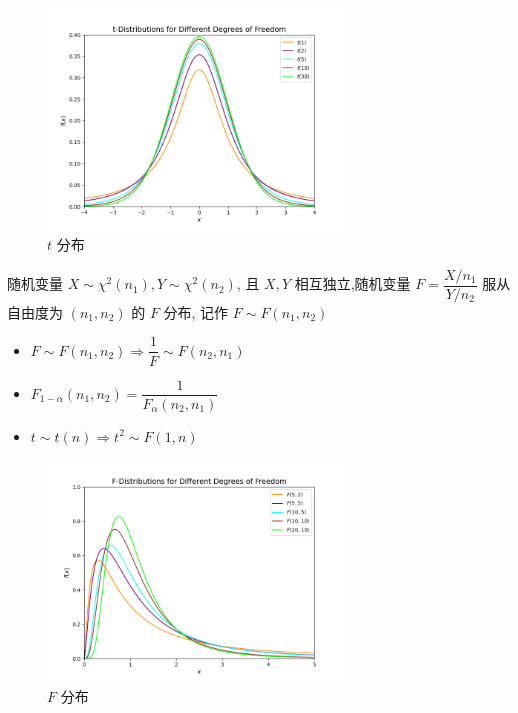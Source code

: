 \begin{figure}[H]
	\centering  %
	\includegraphics[width=0.7\textwidth]{"figure/Note/t分布.png"}
	\caption{ $t$ 分布}
	\label{fig: $t$ 分布}
\end{figure}

\begin{definition}[$F$ 分布]

	随机变量 $X\sim \chi^2(n_{1}), Y\sim \chi^2(n_{2})$, 且 $X,Y$ 相互独立,随机变量 $F = \dfrac{X/n_{1}}{Y/n_{2}}$ 
	服从自由度为 $(n_{1},n_{2})$ 的 $F$ 分布, 记作 $F\sim F(n_{1},n_{2})$
	
	\begin{itemize}
		\item $F\sim F(n_{1},n_{2})\Rightarrow \dfrac{1}{F}\sim F(n_{2},n_{1})$
		\item $F_{1-\alpha}(n_{1},n_{2})=\dfrac{1}{F_{\alpha}(n_{2},n_{1})}$
		\item $t\sim t(n)\Rightarrow t^{2}\sim F(1,n)$
	\end{itemize}
\end{definition}

\begin{figure}[H]
	\centering  %
	\includegraphics[width=0.7\textwidth]{"figure/Note/F分布.png"}
	\caption{ $F$ 分布}
	\label{fig: $F$ 分布}
\end{figure}

